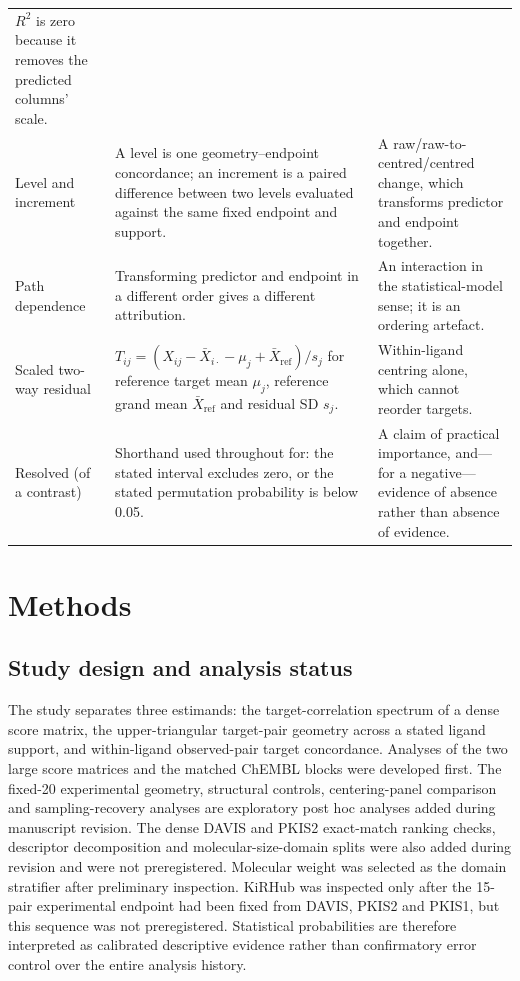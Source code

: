 \documentclass[11pt]{article}
\begin{document}
\begin{table}[t]
\begin{tabular}{p{3.0cm}p{5.4cm}p{6.1cm}}
$R^2$ is zero because it removes the predicted columns' scale. \\
Level and increment &
A level is one geometry--endpoint concordance; an increment is a paired difference between
two levels evaluated against the same fixed endpoint and support. &
A raw/raw-to-centred/centred change, which transforms predictor and endpoint together. \\
Path dependence &
Transforming predictor and endpoint in a different order gives a different attribution. &
An interaction in the statistical-model sense; it is an ordering artefact. \\
Scaled two-way residual &
$T_{ij}=(X_{ij}-\bar X_{i\cdot}-\mu_j+\bar X_{\mathrm{ref}})/s_j$ for reference target mean
$\mu_j$, reference grand mean $\bar X_{\mathrm{ref}}$ and residual SD $s_j$. &
Within-ligand centring alone, which cannot reorder targets. \\
Resolved (of a contrast) &
Shorthand used throughout for: the stated interval excludes zero, or the stated permutation
probability is below 0.05. &
A claim of practical importance, and---for a negative---evidence of absence rather than
absence of evidence. \\
\bottomrule
\end{tabular}
\end{table}

\section{Methods}

\subsection{Study design and analysis status}

The study separates three estimands: the target-correlation spectrum of a dense score
matrix, the upper-triangular target-pair geometry across a stated ligand support, and
within-ligand observed-pair target concordance. Analyses of the two large score matrices and
the matched ChEMBL blocks were developed first. The fixed-20 experimental geometry,
structural controls, centering-panel comparison and sampling-recovery analyses are
exploratory post hoc analyses added during manuscript revision. The dense DAVIS and PKIS2
exact-match ranking checks, descriptor decomposition and molecular-size-domain splits were also
added during revision and were not preregistered. Molecular weight was selected as the
domain stratifier after preliminary inspection.
KiRHub was inspected only
after the 15-pair experimental endpoint had been fixed from DAVIS, PKIS2 and PKIS1, but this
sequence was not preregistered. Statistical probabilities are therefore interpreted as
calibrated descriptive evidence rather than confirmatory error control over the entire
analysis history.
\end{document}
